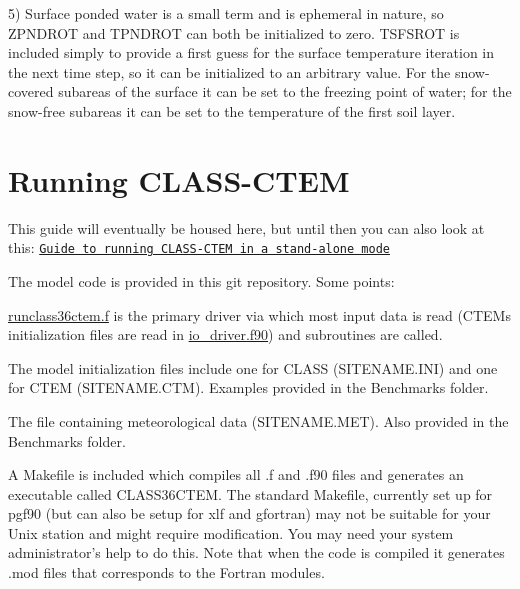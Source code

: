 5) Surface ponded water is a small term and is ephemeral in nature, so Z\+P\+N\+D\+R\+O\+T and T\+P\+N\+D\+R\+O\+T can both be initialized to zero. T\+S\+F\+S\+R\+O\+T is included simply to provide a first guess for the surface temperature iteration in the next time step, so it can be initialized to an arbitrary value. For the snow-\/covered subareas of the surface it can be set to the freezing point of water; for the snow-\/free subareas it can be set to the temperature of the first soil layer.\hypertarget{index_runStandAloneMode}{}\section{Running C\+L\+A\+S\+S-\/\+C\+T\+E\+M}\label{index_runStandAloneMode}
This guide will eventually be housed here, but until then you can also look at this\+: \href{https://docs.google.com/document/d/1pzp7UfNe6aVFXe9LI9XMiGUX2pCALk4tU8MqF_UpQLg/edit?usp=sharing}{\tt Guide to running C\+L\+A\+S\+S-\/\+C\+T\+E\+M in a stand-\/alone mode}

The model code is provided in this git repository. Some points\+:
\begin{DoxyEnumerate}
\item \hyperlink{runclass36ctem_8f}{runclass36ctem.\+f} is the primary driver via which most input data is read (C\+T\+E\+M\textquotesingle{}s initialization files are read in \hyperlink{io__driver_8f90}{io\+\_\+driver.\+f90}) and subroutines are called.
\item The model initialization files include one for C\+L\+A\+S\+S (S\+I\+T\+E\+N\+A\+M\+E.\+I\+N\+I) and one for C\+T\+E\+M (S\+I\+T\+E\+N\+A\+M\+E.\+C\+T\+M). Examples provided in the Benchmarks folder.
\item The file containing meteorological data (S\+I\+T\+E\+N\+A\+M\+E.\+M\+E\+T). Also provided in the Benchmarks folder.
\item A Makefile is included which compiles all .f and .f90 files and generates an executable called C\+L\+A\+S\+S36\+C\+T\+E\+M. The standard Makefile, currently set up for pgf90 (but can also be setup for xlf and gfortran) may not be suitable for your Unix station and might require modification. You may need your system administrator’s help to do this. Note that when the code is compiled it generates .mod files that corresponds to the Fortran modules.
\end{DoxyEnumerate}

